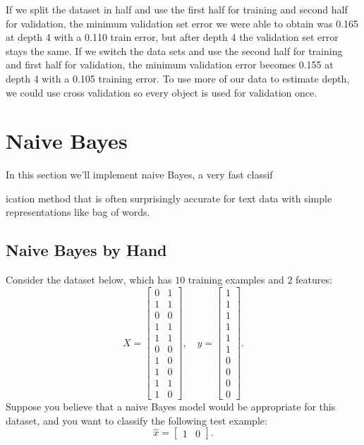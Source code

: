 \documentclass{article}
\begin{document}
If we split the dataset in half and use the first half for training and second half for validation, the minimum validation set error we were able to obtain was 0.165 at depth 4 with a 0.110 train error, but after depth 4 the validation set error stays the same. If we switch the data sets and use the second half for training and first half for validation, the minimum validation error becomes 0.155 at depth 4 with a 0.105 training error. To use more of our data to estimate depth, we could use cross validation so every object is used for validation once.

\section{Naive Bayes}

In this section we'll implement naive Bayes, a very fast classif

ication method that is often surprisingly accurate for text data with simple representations like bag of words.



\subsection{Naive Bayes by Hand}

Consider the dataset below, which has $10$ training examples and $2$ features:
\[
X = \begin{bmatrix}0 & 1\\1 & 1\\ 0 & 0\\ 1 & 1\\ 1 & 1\\ 0 & 0\\  1 & 0\\  1 & 0\\  1 & 1\\  1 &0\end{bmatrix}, \quad y = \begin{bmatrix}1\\1\\1\\1\\1\\1\\0\\0\\0\\0\end{bmatrix}.
\]
Suppose you believe that a naive Bayes model would be appropriate for this dataset, and you want to classify the following test example:
\[
\hat{x} = \begin{bmatrix}1 & 0\end{bmatrix}.
\]
\end{document}
